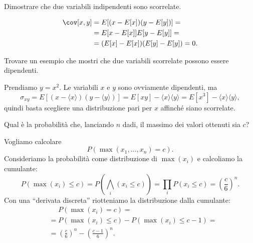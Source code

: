 \begin{exercise}
    Dimostrare che due variabili indipendenti sono scorrelate.
\end{exercise}

\begin{solution}
    \begin{align*}
        \cov[x, y] &= E[(x - E[x])(y - E[y])] = \\
        &= E[x - E[x]] E[y - E[y]] = \\
        &= (E[x] - E[x])(E[y] - E[y]) = 0.
    \end{align*}
\end{solution}

\begin{exercise}
    Trovare un esempio che mostri che due variabili scorrelate possono essere
    dipendenti.
\end{exercise}

\begin{solution}
    Prendiamo $y=x^2$. Le variabili $x$ e $y$ sono ovviamente dipendenti, ma
    \begin{equation*}
    	\sigma_{xy} = E[(x-\langle x\rangle)(y-\langle y\rangle)] = E[xy] - \langle x\rangle\langle y\rangle = E[x^3] - \langle x\rangle\langle y\rangle,
    \end{equation*}
    quindi basta scegliere una distribuzione pari per $x$ affinché siano scorrelate.
\end{solution}

\begin{exercise}
	Qual è la probabilità che, lanciando $n$ dadi, il massimo dei valori ottenuti sia $c$?
\end{exercise}

\begin{solution}
	Vogliamo calcolare
	\begin{equation*}
		P(\max(x_1,\dots,x_n) = c).
	\end{equation*}
	Consideriamo la probabilità come distribuzione di $\max(x_i)$ e calcoliamo la cumulante:
	\begin{equation*}
		P(\max(x_i) \le c) = P\left(\bigwedge_i(x_i \le c)\right) = \prod_i P(x_i \le c) = \left (\frac c6 \right)^n.
	\end{equation*}
	Con una ``derivata discreta'' riotteniamo la distribuzione dalla cumulante:
	\begin{align*}
		&\phantom{{}={}} P(\max(x_i) = c) = \\
		&= P(\max(x_i) \le c) - P(\max(x_i) \le c-1) = \\
		&= \left (\frac c6 \right)^n - \left (\frac {c-1}6 \right)^n.
	\end{align*}
\end{solution}

